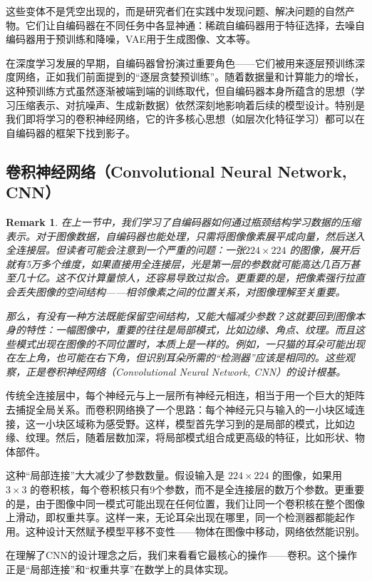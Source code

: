\documentclass[lang=cn,zihao=-4,a4paper,fontset=windows]{beautybook}
\newtheorem*{remark}{\textbf{Remark}}
\begin{document}
这些变体不是凭空出现的，而是研究者们在实践中发现问题、解决问题的自然产物。它们让自编码器在不同任务中各显神通：稀疏自编码器用于特征选择，去噪自编码器用于预训练和降噪，VAE用于生成图像、文本等。

在深度学习发展的早期，自编码器曾扮演过重要角色——它们被用来逐层预训练深度网络，正如我们前面提到的“逐层贪婪预训练”。随着数据量和计算能力的增长，这种预训练方式虽然逐渐被端到端的训练取代，但自编码器本身所蕴含的思想（学习压缩表示、对抗噪声、生成新数据）依然深刻地影响着后续的模型设计。特别是我们即将学习的卷积神经网络，它的许多核心思想（如层次化特征学习）都可以在自编码器的框架下找到影子。

\subsection{卷积神经网络（Convolutional Neural Network, CNN）}
\begin{remark}
在上一节中，我们学习了自编码器如何通过瓶颈结构学习数据的压缩表示。对于图像数据，自编码器也能处理，只需将图像像素展平成向量，然后送入全连接层。但读者可能会注意到一个严重的问题：一张$224\times 224$ 的图像，展开后就有5万多个维度，如果直接用全连接层，光是第一层的参数就可能高达几百万甚至几十亿。这不仅计算量惊人，还容易导致过拟合。更重要的是，把像素强行拉直会丢失图像的空间结构——相邻像素之间的位置关系，对图像理解至关重要。

那么，有没有一种方法既能保留空间结构，又能大幅减少参数？这就要回到图像本身的特性：一幅图像中，重要的往往是局部模式，比如边缘、角点、纹理。而且这些模式出现在图像的不同位置时，本质上是一样的。例如，一只猫的耳朵可能出现在左上角，也可能在右下角，但识别耳朵所需的“检测器”应该是相同的。这些观察，正是卷积神经网络（Convolutional Neural Network, CNN）的设计根基。
\end{remark}

传统全连接层中，每个神经元与上一层所有神经元相连，相当于用一个巨大的矩阵去捕捉全局关系。而卷积网络换了一个思路：每个神经元只与输入的一小块区域连接，这一小块区域称为感受野。这样，模型首先学习到的是局部的模式，比如边缘、纹理。然后，随着层数加深，将局部模式组合成更高级的特征，比如形状、物体部件。

这种“局部连接”大大减少了参数数量。假设输入是 \(224\times224\) 的图像，如果用 \(3\times3\) 的卷积核，每个卷积核只有9个参数，而不是全连接层的数万个参数。更重要的是，由于图像中同一模式可能出现在任何位置，我们让同一个卷积核在整个图像上滑动，即权重共享。这样一来，无论耳朵出现在哪里，同一个检测器都能起作用。这种设计天然赋予模型平移不变性——物体在图像中移动，网络依然能识别。

在理解了CNN的设计理念之后，我们来看看它最核心的操作——卷积。这个操作正是“局部连接”和“权重共享”在数学上的具体实现。
\end{document}
